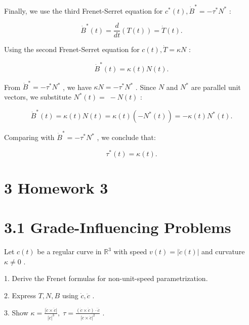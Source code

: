 \documentclass[10pt]{article}
\begin{document}
Finally, we use the third Frenet-Serret equation for \({c}^{ * }\left( t\right) ,{\dot{B}}^{ * } =  - {\tau }^{ * }{N}^{ * }\) :

\[
{\dot{B}}^{ * }\left( t\right)  = \frac{d}{dt}\left( {T\left( t\right) }\right)  = \dot{T}\left( t\right) .
\]

Using the second Frenet-Serret equation for \(c\left( t\right) ,\dot{T} = {\kappa N}\) :

\[
{\dot{B}}^{ * }\left( t\right)  = \kappa \left( t\right) N\left( t\right) .
\]

From \({\dot{B}}^{ * } =  - {\tau }^{ * }{N}^{ * }\) , we have \({\kappa N} =  - {\tau }^{ * }{N}^{ * }\) . Since \(N\) and \({N}^{ * }\) are parallel unit vectors, we substitute \({N}^{ * }\left( t\right)  = \; - N\left( t\right)\) :

\[
{\dot{B}}^{ * }\left( t\right)  = \kappa \left( t\right) N\left( t\right)  = \kappa \left( t\right) \left( {-{N}^{ * }\left( t\right) }\right)  =  - \kappa \left( t\right) {N}^{ * }\left( t\right) .
\]

Comparing with \({\dot{B}}^{ * } =  - {\tau }^{ * }{N}^{ * }\) , we conclude that:

\[
{\tau }^{ * }\left( t\right)  = \kappa \left( t\right) .
\]

\section*{3 Homework 3}

\section*{3.1 Grade-Influencing Problems}

\begin{problem}[title=PROBLEM 1 (9 POINTS)]
Let \(c\left( t\right)\) be a regular curve in \({\mathbb{R}}^{3}\) with speed \(v\left( t\right)  = \left| {\dot{c}\left( t\right) }\right|\) and curvature \(\kappa  \neq  0\) .

1. Derive the Frenet formulas for non-unit-speed parametrization.

2. Express \(T,N,B\) using \(\dot{c},\ddot{c}\) .

3. Show \(\kappa  = \frac{\left| \dot{c} \times  \ddot{c}\right| }{{\left| \dot{c}\right| }^{3}},\;\tau  = \frac{\left( {\dot{c} \times  \ddot{c}}\right)  \cdot  \dddot{c}}{{\left| \dot{c} \times  \ddot{c}\right| }^{2}}\) .
\end{problem}
\end{document}
